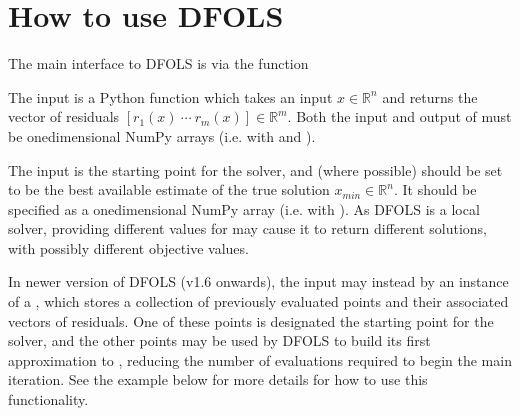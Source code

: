 \documentclass[letterpaper,10pt,english]{sphinxmanual}
\begin{document}
\section{How to use DFO\sphinxhyphen{}LS}
\label{\detokenize{userguide:how-to-use-dfo-ls}}
\sphinxAtStartPar
The main interface to DFO\sphinxhyphen{}LS is via the function 
\begin{quote}

\begin{sphinxVerbatim}[commandchars=\\\{\}]
   
\end{sphinxVerbatim}
\end{quote}

\sphinxAtStartPar
The input  is a Python function which takes an input \(x\in\mathbb{R}^n\) and returns the vector of residuals \([r_1(x)\: \cdots \: r_m(x)]\in\mathbb{R}^m\). Both the input and output of  must be one\sphinxhyphen{}dimensional NumPy arrays (i.e. with  and ).

\sphinxAtStartPar
The input  is the starting point for the solver, and (where possible) should be set to be the best available estimate of the true solution \(x_{min}\in\mathbb{R}^n\). It should be specified as a one\sphinxhyphen{}dimensional NumPy array (i.e. with ).
As DFO\sphinxhyphen{}LS is a local solver, providing different values for  may cause it to return different solutions, with possibly different objective values.

\sphinxAtStartPar
In newer version of DFO\sphinxhyphen{}LS (v1.6 onwards), the input  may instead by an instance of a , which stores a collection
of previously evaluated points and their associated vectors of residuals. One of these points is designated the starting point for the solver, and the other
points may be used by DFO\sphinxhyphen{}LS to build its first approximation to , reducing the number of evaluations required to begin the main iteration.
See the example below for more details for how to use this functionality.
\end{document}
